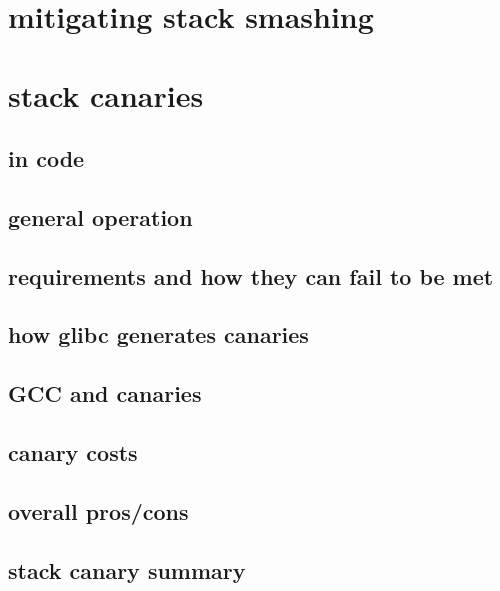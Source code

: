 \section{mitigating stack smashing}


\section{stack canaries}
\subsection{in code}


\subsection{general operation}


\subsection{requirements and how they can fail to be met}

\subsection{how glibc generates canaries}


\subsection{GCC and canaries}


\subsection{canary costs}


\subsection{overall pros/cons}


\subsection{stack canary summary}


